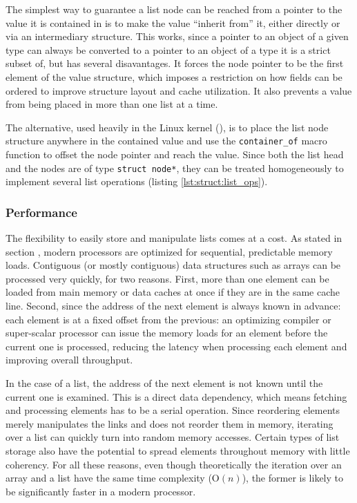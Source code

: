 The simplest way to guarantee a list node can be reached from a pointer to the
value it is contained in is to make the value ``inherit from'' it\footnotemark,
either directly or via an intermediary structure.  This works, since a pointer
to an object of a given type can always be converted to a pointer to an object
of a type it is a strict subset of, but has several disavantages.  It forces the
node pointer to be the first element of the value structure, which imposes a
restriction on how fields can be ordered to improve structure layout and cache
utilization.  It also prevents a value from being placed in more than one list
at a time.


The alternative, used heavily in the Linux kernel (\cite{Brown2009}), is to
place the list node structure anywhere in the contained value and use the
\texttt{container\_of} macro function to offset the node pointer and reach the
value.  Since both the list head and the nodes are of type \texttt{struct
node*}, they can be treated homogeneously to implement several list operations
(listing \ref{lst:struct:list_ops}).



\subsubsection{Performance}

The flexibility to easily store and manipulate lists comes at a cost.  As stated
in section , modern processors are optimized for
sequential, predictable memory loads.  Contiguous (or mostly contiguous) data
structures such as arrays can be processed very quickly, for two reasons.
First, more than one element can be loaded from main memory or data caches at
once if they are in the same cache line.  Second, since the address of the next
element is always known in advance: each element is at a fixed offset from the
previous: an optimizing compiler or super-scalar processor can issue the memory
loads for an element before the current one is processed, reducing the latency
when processing each element and improving overall throughput.

In the case of a list, the address of the next element is not known until the
current one is examined.  This is a direct data dependency, which means fetching
and processing elements has to be a serial operation.  Since reordering elements
merely manipulates the links and does not reorder them in memory, iterating over
a list can quickly turn into random memory accesses.  Certain types of list
storage also have the potential to spread elements throughout memory with little
coherency.  For all these reasons, even though theoretically the iteration over
an array and a list have the same time complexity ($\text{O}(n)$), the former is
likely to be significantly faster in a modern processor.

